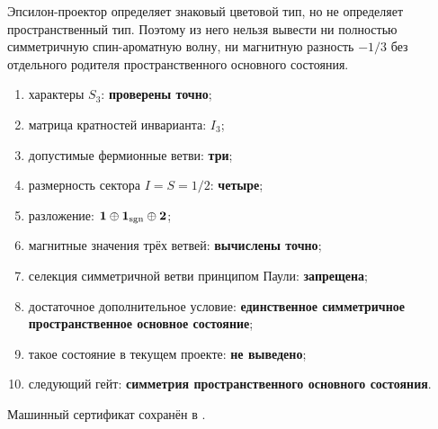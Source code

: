 \begin{nogocriterion}
Эпсилон-проектор определяет знаковый цветовой тип, но не определяет
пространственный тип. Поэтому из него нельзя вывести ни полностью
симметричную спин-ароматную волну, ни магнитную разность $-1/3$ без
отдельного родителя пространственного основного состояния.
\end{nogocriterion}

\begin{protocol}
\begin{enumerate}
 \item характеры $S_3$: \textbf{проверены точно};
 \item матрица кратностей инварианта: \textbf{$I_3$};
 \item допустимые фермионные ветви: \textbf{три};
 \item размерность сектора $I=S=1/2$: \textbf{четыре};
 \item разложение: \textbf{$\mathbf1\oplus\mathbf1_{\rm sgn}\oplus\mathbf2$};
 \item магнитные значения трёх ветвей: \textbf{вычислены точно};
 \item селекция симметричной ветви принципом Паули: \textbf{запрещена};
 \item достаточное дополнительное условие: \textbf{единственное
 симметричное пространственное основное состояние};
 \item такое состояние в текущем проекте: \textbf{не выведено};
 \item следующий гейт: \textbf{симметрия пространственного основного
 состояния}.
\end{enumerate}
\end{protocol}

Машинный сертификат сохранён в
.